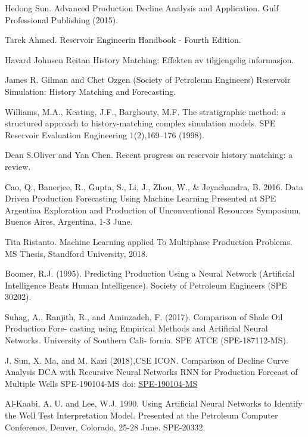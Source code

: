 \documentclass[12pt,a4paper]{report}
\begin{document}
  
\begin{thebibliography}{1}

Hedong Sun.
\newblock Advanced Production Decline Analysis and Application.
\newblock Gulf Professional Publishing (2015).

Tarek Ahmed.
\newblock Reservoir Engineerin Handbook - Fourth Edition.

Havard Johnsen Reitan
\newblock History Matching: Effekten av tilgjengelig informasjon.

James R. Gilman and Chet Ozgen (Society of Petroleum Engineers)
\newblock Reservoir Simulation: History Matching and Forecasting.

Williams, M.A., Keating, J.F., Barghouty, M.F.
\newblock The stratigraphic method: a structured approach to history-matching complex simulation models. SPE Reservoir Evaluation  Engineering 1(2),169–176 (1998).

Dean S.Oliver and Yan Chen.
\newblock Recent progress on reservoir history matching: a review.

Cao, Q., Banerjee, R., Gupta, S., Li, J., Zhou, W., \& Jeyachandra, B. 2016.
\newblock Data Driven Production Forecasting Using Machine Learning
\newblock Presented at SPE Argentina Exploration and Production of Unconventional Resources Symposium, Buenos Aires, Argentina, 1-3 June.

Tita Ristanto.
\newblock Machine Learning
applied To Multiphase Production Problems.
\newblock MS Thesis, Standford University, 2018.

Boomer, R.J. (1995).
\newblock Predicting Production Using a Neural Network (Artificial Intelligence Beats Human Intelligence).
\newblock Society of Petroleum Engineers (SPE 30202).

Suhag, A., Ranjith, R., and Aminzadeh, F. (2017).
\newblock Comparison of Shale Oil Production Fore- casting using Empirical Methods and Artificial Neural Networks.
\newblock University of Southern Cali- fornia. SPE ATCE (SPE-187112-MS).

J. Sun, X. Ma, and M. Kazi (2018),CSE ICON.
\newblock Comparison of Decline Curve Analysis DCA with Recursive Neural Networks RNN for Production Forecast of Multiple Wells
\newblock SPE-190104-MS doi: \href{https://doi.org/10.2118/190104-MS}{SPE-190104-MS}

Al-Kaabi, A. U. and Lee, W.J. 1990.
\newblock Using Artificial Neural Networks to Identify the Well Test Interpretation Model.
\newblock Presented at the Petroleum Computer Conference, Denver, Colorado, 25-28 June. SPE-20332.


\end{thebibliography}
\end{document}
